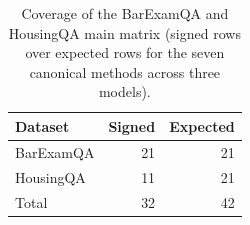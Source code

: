 \begin{table}[H]
\centering
\caption{Coverage of the BarExamQA and HousingQA main matrix (signed rows over expected rows for the seven canonical methods across three models).}
\label{tab:coverage}
\small
\begin{tabular}{lrr}
\toprule
Dataset & Signed & Expected \\
\midrule
BarExamQA & 21 & 21 \\
HousingQA & 11 & 21 \\
\midrule
Total & 32 & 42 \\
\bottomrule
\end{tabular}
\end{table}
